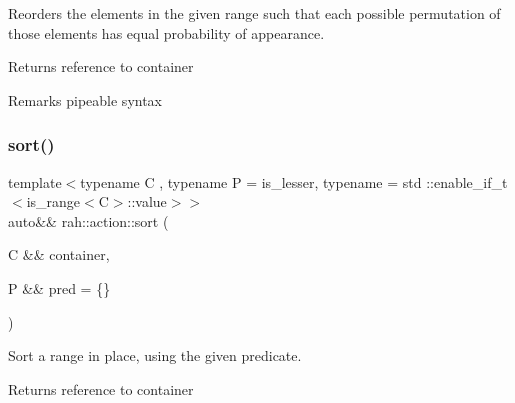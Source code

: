 Reorders the elements in the given range such that each possible permutation of those elements has equal probability of appearance. 

\begin{DoxyReturn}{Returns}
reference to container 
\end{DoxyReturn}
\begin{DoxyRemark}{Remarks}
pipeable syntax
\end{DoxyRemark}

\begin{DoxyCodeInclude}{0}
\end{DoxyCodeInclude}
\mbox{\label{namespacerah_1_1action_ae8518431f6e5e7415a6739c65e874ab8}} 
\subsubsection{\texorpdfstring{sort()}{sort()}\hspace{0.1cm}{\footnotesize\ttfamily [1/2]}}
{\footnotesize\ttfamily template$<$typename C , typename P  = is\+\_\+lesser, typename  = std \+::enable\+\_\+if\+\_\+t$<$is\+\_\+range$<$\+C$>$\+::value$>$$>$ \\
auto\&\& rah\+::action\+::sort (\begin{DoxyParamCaption}\item[{C \&\&}]{container,  }\item[{P \&\&}]{pred = {\ttfamily \{\}} }\end{DoxyParamCaption})}



Sort a range in place, using the given predicate. 

\begin{DoxyReturn}{Returns}
reference to container
\end{DoxyReturn}

\begin{DoxyCodeInclude}{0}
\end{DoxyCodeInclude}

